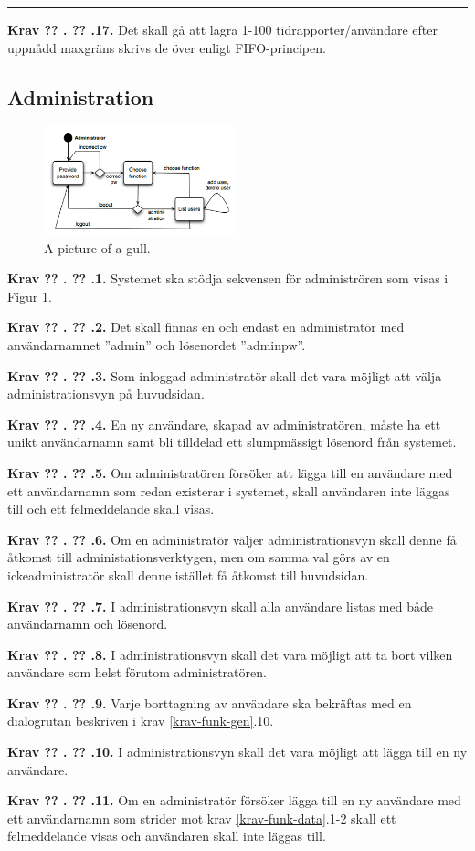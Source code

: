 \documentclass[a4paper]{article}
\newcommand\getcurrentref[1]{%
 \ifnumequal{\value{#1}}{0}
  {??}
  {\the\value{#1}}%
}
\newcommand\requirement[2]{
	\numberedrow{Krav}{#1}{#2}
}
\newcommand\numberedrow[3]{
	\noindent
	\textbf{#1 \getcurrentref{section}.\getcurrentref{subsection}.#2.} #3
	
}
\begin{document}
\noindent\rule{8cm}{0.4pt}  %

\requirement{17}{Det skall gå att lagra 1-100 tidrapporter/användare efter uppnådd maxgräns skrivs de över enligt FIFO-principen.}

\subsection{Administration}
\label{krav-funk-admin}

\begin{figure}[h!]
  \centering
    \includegraphics[width=0.5\textwidth]{admin_usage}
   \caption{A picture of a gull.}
   \label{image_admin_usage}
\end{figure}
\requirement{1}{Systemet ska stödja sekvensen för administrören som visas i Figur \ref{image_admin_usage}.}
\requirement{2}{Det skall finnas en och endast en administratör med användarnamnet ''admin'' och lösenordet ''adminpw''.}
\requirement{3}{Som inloggad administratör skall det vara möjligt att välja administrationsvyn på huvudsidan.}
\requirement{4}{En ny användare, skapad av administratören, måste ha ett unikt användarnamn samt bli tilldelad ett slumpmässigt lösenord från systemet.}
\requirement{5}{Om administratören försöker att lägga till en användare med ett användarnamn som redan existerar i systemet, skall användaren inte läggas till och ett felmeddelande skall visas.}
\requirement{6}{Om en administratör väljer administrationsvyn skall denne få åtkomst till administationsverktygen, men om samma val görs av en ickeadministratör skall denne istället få åtkomst till huvudsidan.}
\requirement{7}{I administrationsvyn skall alla användare listas med både användarnamn och lösenord.}
\requirement{8}{I administrationsvyn skall det vara möjligt att ta bort vilken användare som helst förutom administratören.}
\requirement{9}{Varje borttagning av användare ska bekräftas med en dialogrutan beskriven i krav \ref{krav-funk-gen}.10.}
\requirement{10}{I administrationsvyn skall det vara möjligt att lägga till en ny användare.}
\requirement{11}{Om en administratör försöker lägga till en ny användare med ett användarnamn som strider mot krav \ref{krav-funk-data}.1-2 skall ett felmeddelande visas och användaren skall inte läggas till.}
\end{document}
